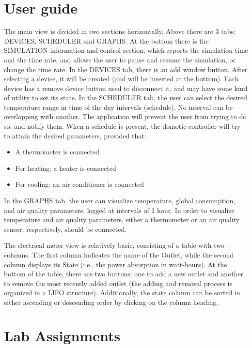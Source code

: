 \documentclass[a4paper,12pt]{report}
\begin{document}




\appendix
\chapter{User guide}

The main view is divided in two sections horizontally. \newline
Above there are 3 tabs: DEVICES, SCHEDULER and GRAPHS. \newline
At the bottom there is the SIMULATION information and control section, which reports the simulation time and the time rate, and allows the user to pause and resume the simulation, or change the time rate. \newline
In the DEVICES tab, there is an add window button. After selecting a device,
it will be created (and will be inserted at the bottom). Each device has a remove device button
used to disconnect it, and may have some kind of utility to set its state. \newline
In the SCHEDULER tab, the user can select the desired temperature range in time of the day intervals (schedule). \newline
No interval can be overlapping with another. The application will prevent the user from trying to do so, and notify them. \newline
When a schedule is present, the domotic controller will try to attain the desired parameters, provided that:
\begin{itemize}
	\item A thermometer is connected
	\item For heating: a heater is connected
	\item For cooling: an air conditioner is connected
\end{itemize}
In the GRAPHS tab, the user can visualize temperature, global consumption, and air quality parameters, logged at intervals of 1 hour. \newline
In order to visualize temperature and air quality parameters, either a thermometer or an air quality sensor, respectively, should be connected.

The electrical meter view is relatively basic, consisting of a table with two columns. \newline
The first column indicates the name of the Outlet, while the second column displays its State (i.e., the power absorption in watt-hours). \newline
At the bottom of the table, there are two buttons: one to add a new outlet and another to remove the most recently added outlet 
(the adding and removal process is organized in a LIFO structure). \newline
Additionally, the state column can be sorted in either ascending or descending order by clicking on the column heading.

\chapter{Lab Assignments}







\end{document}
